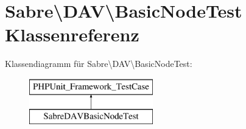 \hypertarget{class_sabre_1_1_d_a_v_1_1_basic_node_test}{}\section{Sabre\textbackslash{}D\+AV\textbackslash{}Basic\+Node\+Test Klassenreferenz}
\label{class_sabre_1_1_d_a_v_1_1_basic_node_test}
Klassendiagramm für Sabre\textbackslash{}D\+AV\textbackslash{}Basic\+Node\+Test\+:\begin{figure}[H]
\begin{center}
\leavevmode
\includegraphics[height=2.000000cm]{class_sabre_1_1_d_a_v_1_1_basic_node_test}
\end{center}
\end{figure}
